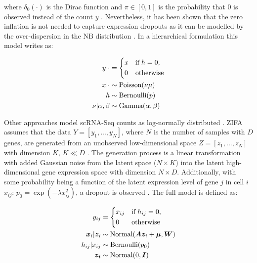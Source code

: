 where $\delta_0(\cdot)$ is the Dirac function and $\pi\in[0,1]$ is the probability that 0 is observed instead of the count $y$ \citep{Risso2018}. 
Nevertheless, it has been shown that the zero inflation is not needed to capture expression dropouts as it can be modelled by the over-dispersion in the NB distribution \citep{Lopez2018}. 
In a hierarchical formulation this model writes as:

\begin{align*}
y|\cdot & = 
 \left\lbrace
  \begin{aligned}
    & x && \textnormal{if} \; h = 0,  \\ 
    & 0 && \textnormal{otherwise}    	    
  \end{aligned}
\right.\\
x|\cdot&\sim{}\textnormal{Poisson}(\nu\mu)\\
h & \sim \textnormal{Bernoulli}(p)\\
\nu|\alpha,\beta&\sim{}\textnormal{Gamma}(\alpha,\beta)
\end{align*}

Other approaches model scRNA-Seq counts as log-normally distributed \citep{Azizi2017,Pierson2015}. 
\Gls{ZIFA} assumes that the data $Y=[y_1,...,y_N]$, where $N$ is the number of samples with $D$ genes, are generated from an unobserved low-dimensional space $Z=[z_1,...,z_N]$ with dimension $K,\,{}K\ll{}D$ \citep{Pierson2015}. 
The generation process is a linear transformation with added Gaussian noise from the latent space ($N\times{}K$) into the latent high-dimensional gene expression space with dimension $N\times{}D$. 
Additionally, with some probability being a function of the latent expression level of gene $j$ in cell $i$ $x_{ij}$: $p_0=\exp(-\lambda{}x_{ij}^2)$, a dropout is observed \citep{Pierson2015}. 
The full model is defined as:

\begin{align*}
y_{ij} & = 
 \left\lbrace
  \begin{aligned}
    & x_{ij} && \textnormal{if} \; h_{ij} = 0,  \\ 
    & 0 && \textnormal{otherwise}    	    
  \end{aligned}
\right.\\
\bm{x}_{i}|\bm{z}_i&\sim{}\textnormal{Normal}(\bm{Az}_i+\bm{\mu},\bm{W})\\
h_{ij}|x_{ij} & \sim \textnormal{Bernoulli}(p_0)\\
\bm{z_i}&\sim{}\textnormal{Normal}(0,\bm{I})
\end{align*} 

